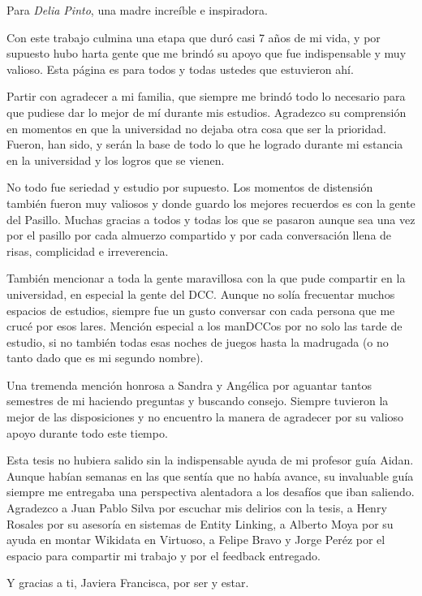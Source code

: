 \documentclass[upright, contnum]{umemoria}
\begin{document}
\begin{dedicatoria} %
Para \emph{Delia Pinto}, una madre increíble e inspiradora.
\end{dedicatoria}

\begin{thanks} %
Con este trabajo culmina una etapa que duró casi 7 años de mi vida, y por supuesto hubo harta gente 
que me brindó su apoyo que fue indispensable y muy valioso. Esta página es para todos y todas ustedes 
que estuvieron ahí. 

Partir con agradecer a mi familia, que siempre me brindó todo lo necesario para que pudiese dar lo 
mejor de mí durante mis estudios. Agradezco su comprensión en momentos en que la universidad no 
dejaba otra cosa que ser la prioridad. Fueron, han sido, y serán la base de todo lo que he logrado 
durante mi estancia en la universidad y los logros que se vienen.

No todo fue seriedad y estudio por supuesto. Los momentos de distensión también fueron muy valiosos y 
donde guardo los mejores recuerdos es con la gente del Pasillo. Muchas gracias a todos y todas los 
que se pasaron aunque sea una vez por el pasillo por cada almuerzo compartido y por cada conversación 
llena de risas, complicidad e irreverencia. 

También mencionar a toda la gente maravillosa con la que pude compartir en la universidad, en especial la 
gente del DCC. Aunque no solía frecuentar muchos espacios de estudios, siempre fue un gusto conversar con 
cada persona que me crucé por esos lares. Mención especial a los manDCCos por no solo las tarde de estudio, 
si no también todas esas noches de juegos hasta la madrugada (o no tanto dado que  
es mi segundo nombre).

Una tremenda mención honrosa a Sandra y Angélica por aguantar tantos semestres de mi haciendo preguntas 
y buscando consejo. Siempre tuvieron la mejor de las disposiciones y no encuentro la manera de agradecer
por su valioso apoyo durante todo este tiempo. 

Esta tesis no hubiera salido sin la indispensable ayuda de mi profesor guía Aidan. 
Aunque habían semanas en las que sentía que no había avance, su invaluable guía siempre me 
entregaba una perspectiva alentadora a los desafíos que iban saliendo. Agradezco a Juan Pablo Silva por 
escuchar mis delirios con la tesis, a Henry Rosales por su asesoría en sistemas de Entity Linking, a 
Alberto Moya por su ayuda en montar Wikidata en Virtuoso, a Felipe Bravo y Jorge Peréz 
por el espacio para compartir mi trabajo y por el feedback entregado. 

Y gracias a ti, Javiera Francisca, por ser y estar.
\end{thanks}
\cleardoublepage
\end{document}
